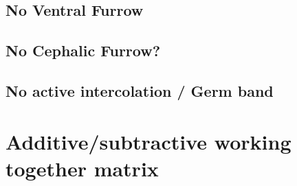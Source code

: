 \subsection{No Ventral Furrow}
\subsection{No Cephalic Furrow?}
\subsection{No active intercolation / Germ band}
\section{Additive/subtractive working together matrix}
